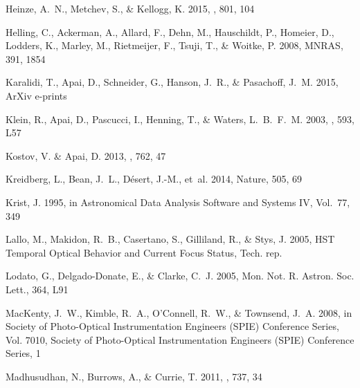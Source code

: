 \documentclass[apj]{emulateapj}
\begin{document}
\begin{thebibliography}{52}
{Heinze}, A.~N., {Metchev}, S., \& {Kellogg}, K. 2015, \apj, 801, 104

Helling, C., Ackerman, A., Allard, F., Dehn, M., Hauschildt, P., Homeier, D.,
  Lodders, K., Marley, M., Rietmeijer, F., Tsuji, T., \& Woitke, P. 2008,
  MNRAS, 391, 1854

{Karalidi}, T., {Apai}, D., {Schneider}, G., {Hanson}, J.~R., \& {Pasachoff},
  J.~M. 2015, ArXiv e-prints

{Klein}, R., {Apai}, D., {Pascucci}, I., {Henning}, T., \& {Waters},
  L.~B.~F.~M. 2003, \apjl, 593, L57

{Kostov}, V. \& {Apai}, D. 2013, \apj, 762, 47

Kreidberg, L., Bean, J.~L., D\'{e}sert, J.-M., {et~al.} 2014, Nature, 505, 69

Krist, J. 1995, in Astronomical Data Analysis Software and Systems IV, Vol.~77,
  349

{Lallo}, M., {Makidon}, R.~B., {Casertano}, S., {Gilliland}, R., \& {Stys}, J.
  2005, {HST Temporal Optical Behavior and Current Focus Status}, Tech. rep.

Lodato, G., Delgado-Donate, E., \& Clarke, C.~J. 2005, Mon. Not. R. Astron.
  Soc. Lett., 364, L91

{MacKenty}, J.~W., {Kimble}, R.~A., {O'Connell}, R.~W., \& {Townsend}, J.~A.
  2008, in Society of Photo-Optical Instrumentation Engineers (SPIE) Conference
  Series, Vol. 7010, Society of Photo-Optical Instrumentation Engineers (SPIE)
  Conference Series, 1

{Madhusudhan}, N., {Burrows}, A., \& {Currie}, T. 2011, \apj, 737, 34


\end{thebibliography}
\end{document}
